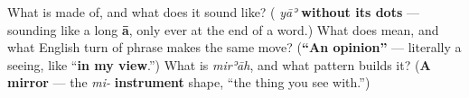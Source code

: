 \begin{tcolorbox}[breakable,colback=teal!4,colframe=teal!35!black,title={Before you move on}]
What is \textbf{} made of, and what does it sound like? (\textbf{} \emph{yāʾ} \textbf{without its dots} — sounding like a long \textbf{ā}, only ever at the end of a word.) What does \textbf{} mean, and what English turn of phrase makes the same move? (\textbf{\textquotedblleft{}An opinion\textquotedblright{}} — literally a seeing, like \textquotedblleft{}\textbf{in my view}.\textquotedblright{}) What is \emph{mirʾāh}, and what pattern builds it? (\textbf{A mirror} — the \emph{mi-} \textbf{instrument} shape, \textquotedblleft{}the thing you see with.\textquotedblright{})
\end{tcolorbox}
